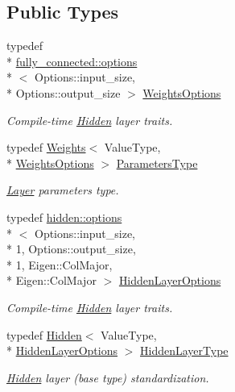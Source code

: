 \subsection*{Public Types}
\begin{DoxyCompactItemize}
\item 
typedef \\*
\hyperlink{structffnn_1_1layer_1_1fully__connected_1_1options}{fully\-\_\-connected\-::options}\\*
$<$ Options\-::input\-\_\-size, \\*
Options\-::output\-\_\-size $>$ \hyperlink{structffnn_1_1layer_1_1fully__connected_1_1extrinsics_ab1412ad01dbaed107141f39e23c73ab5}{Weights\-Options}
\begin{DoxyCompactList}\small\item\em Compile-\/time \hyperlink{classffnn_1_1layer_1_1_hidden}{Hidden} layer traits. \end{DoxyCompactList}\item 
typedef \hyperlink{classffnn_1_1layer_1_1fully__connected_1_1_weights}{Weights}$<$ Value\-Type, \\*
\hyperlink{structffnn_1_1layer_1_1fully__connected_1_1extrinsics_ab1412ad01dbaed107141f39e23c73ab5}{Weights\-Options} $>$ \hyperlink{structffnn_1_1layer_1_1fully__connected_1_1extrinsics_a829f6f75fcd23a45225c85b7b0ac51f3}{Parameters\-Type}
\begin{DoxyCompactList}\small\item\em \hyperlink{classffnn_1_1layer_1_1_layer}{Layer} parameters type. \end{DoxyCompactList}\item 
typedef \hyperlink{structffnn_1_1layer_1_1hidden_1_1options}{hidden\-::options}\\*
$<$ Options\-::input\-\_\-size, \\*
1, Options\-::output\-\_\-size, \\*
1, Eigen\-::\-Col\-Major, \\*
Eigen\-::\-Col\-Major $>$ \hyperlink{structffnn_1_1layer_1_1fully__connected_1_1extrinsics_a051d178770500c0f9775ab63d8a8f9fb}{Hidden\-Layer\-Options}
\begin{DoxyCompactList}\small\item\em Compile-\/time \hyperlink{classffnn_1_1layer_1_1_hidden}{Hidden} layer traits. \end{DoxyCompactList}\item 
typedef \hyperlink{classffnn_1_1layer_1_1_hidden}{Hidden}$<$ Value\-Type, \\*
\hyperlink{structffnn_1_1layer_1_1fully__connected_1_1extrinsics_a051d178770500c0f9775ab63d8a8f9fb}{Hidden\-Layer\-Options} $>$ \hyperlink{structffnn_1_1layer_1_1fully__connected_1_1extrinsics_aafc02edf8e6c520eae8e44f92abb1925}{Hidden\-Layer\-Type}
\begin{DoxyCompactList}\small\item\em \hyperlink{classffnn_1_1layer_1_1_hidden}{Hidden} layer (base type) standardization. \end{DoxyCompactList}\end{DoxyCompactItemize}


